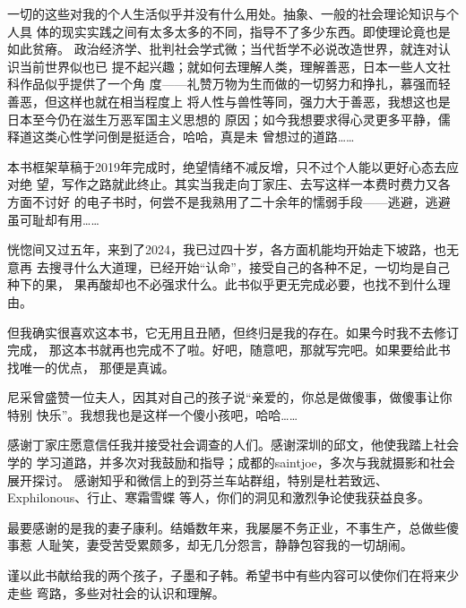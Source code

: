一切的这些对我的个人生活似乎并没有什么用处。抽象、一般的社会理论知识与个人具
体的现实实践之间有太多太多的不同，指导不了多少东西。即使理论竟也是如此贫瘠。
政治经济学、批判社会学式微；当代哲学不必说改造世界，就连对认识当前世界似也已
提不起兴趣；就如何去理解人类，理解善恶，日本一些人文社科作品似乎提供了一个角
度——礼赞万物为生而做的一切努力和挣扎，慕强而轻善恶，但这样也就在相当程度上
将人性与兽性等同，强力大于善恶，我想这也是日本至今仍在滋生万恶军国主义思想的
原因；如今我想要求得心灵更多平静，儒释道这类心性学问倒是挺适合，哈哈，真是未
曾想过的道路……

本书框架草稿于2019年完成时，绝望情绪不减反增，只不过个人能以更好心态去应对绝
望，写作之路就此终止。其实当我走向丁家庄、去写这样一本费时费力又各方面不讨好
的电子书时，何尝不是我熟用了二十余年的懦弱手段——逃避，逃避虽可耻却有用……

恍惚间又过五年，来到了2024，我已过四十岁，各方面机能均开始走下坡路，也无意再
去搜寻什么大道理，已经开始“认命”，接受自己的各种不足，一切均是自己种下的果，
果再酸却也不必强求什么。此书似乎更无完成必要，也找不到什么理由。

但我确实很喜欢这本书，它无用且丑陋，但终归是我的存在。如果今时我不去修订完成，
那这本书就再也完成不了啦。好吧，随意吧，那就写完吧。如果要给此书找唯一的优点，
那便是真诚。

尼采曾盛赞一位夫人，因其对自己的孩子说“亲爱的，你总是做傻事，做傻事让你特别
快乐”。我想我也是这样一个傻小孩吧，哈哈……

感谢丁家庄愿意信任我并接受社会调查的人们。感谢深圳的邱文，他使我踏上社会学的
学习道路，并多次对我鼓励和指导；成都的saintjoe，多次与我就摄影和社会展开探讨。
感谢知乎和微信上的到芬兰车站群组，特别是杜若致远、Exphilonous、行止、寒霜雪蝶
等人，你们的洞见和激烈争论使我获益良多。


最要感谢的是我的妻子康利。结婚数年来，我屡屡不务正业，不事生产，总做些傻事惹
人耻笑，妻受苦受累颇多，却无几分怨言，静静包容我的一切胡闹。

谨以此书献给我的两个孩子，子墨和子韩。希望书中有些内容可以使你们在将来少走些
弯路，多些对社会的认识和理解。



